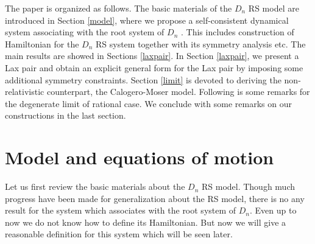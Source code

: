 \documentclass[a4paper,12pt]{article}
\begin{document}
The paper is organized as follows. The basic materials of the $D_{n}$ RS
model are introduced in Section \ref{model}, where we propose a
self-consistent dynamical system associating with the root system of $D_{n}$
. This includes construction of Hamiltonian for the $D_{n}$ RS system
together with its symmetry analysis etc. The main results are showed in
Sections \ref{laxpair}. In Section \ref{laxpair}, we present a Lax pair and
obtain an  explicit general form for the Lax pair by imposing some
additional symmetry constraints. Section \ref{limit} is devoted to deriving
the non-relativistic counterpart, the Calogero-Moser model. Following is
some remarks for the degenerate limit of rational case. We conclude with some
remarks on our constructions in the last section.

\section{Model and equations of motion}

\setcounter{equation}{0} \label{model}

Let us first review the basic materials about the $D_{n}$ RS model. Though
much progress have been made for generalization about the RS model\cite
{r2,ko1,di,kai3,Che00,Che01}, there is no any result for the system which
associates with the root system of $D_{n}$. Even up to now we do not know
how to define its Hamiltonian. But now we will give a reasonable definition
for this system which will be seen later.
\end{document}
